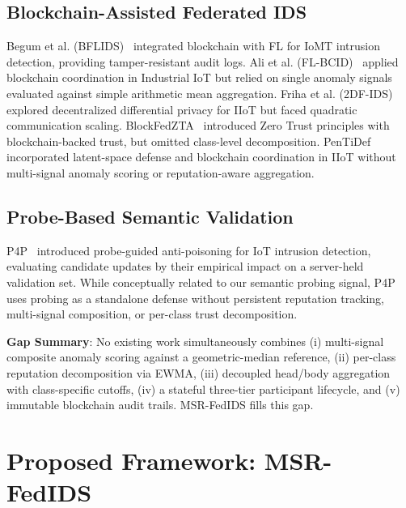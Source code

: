 \documentclass[conference]{IEEEtran}
\begin{document}
\subsection{Blockchain-Assisted Federated IDS}
Begum et al. (BFLIDS)~\cite{begum2024bflids} integrated blockchain with FL for IoMT intrusion detection, providing tamper-resistant audit logs. Ali et al. (FL-BCID)~\cite{ali2025flbcid} applied blockchain coordination in Industrial IoT but relied on single anomaly signals evaluated against simple arithmetic mean aggregation. Friha et al. (2DF-IDS)~\cite{friha20232dfids} explored decentralized differential privacy for IIoT but faced quadratic communication scaling. BlockFedZTA~\cite{blockfedzta2026} introduced Zero Trust principles with blockchain-backed trust, but omitted class-level decomposition. PenTiDef~\cite{pentidef2026} incorporated latent-space defense and blockchain coordination in IIoT without multi-signal anomaly scoring or reputation-aware aggregation.

\subsection{Probe-Based Semantic Validation}
P4P~\cite{p4p2026} introduced probe-guided anti-poisoning for IoT intrusion detection, evaluating candidate updates by their empirical impact on a server-held validation set. While conceptually related to our semantic probing signal, P4P uses probing as a standalone defense without persistent reputation tracking, multi-signal composition, or per-class trust decomposition.

\textbf{Gap Summary}: No existing work simultaneously combines (i) multi-signal composite anomaly scoring against a geometric-median reference, (ii) per-class reputation decomposition via EWMA, (iii) decoupled head/body aggregation with class-specific cutoffs, (iv) a stateful three-tier participant lifecycle, and (v) immutable blockchain audit trails. MSR-FedIDS fills this gap.

\section{Proposed Framework: MSR-FedIDS}
\label{sec:framework}
\end{document}
